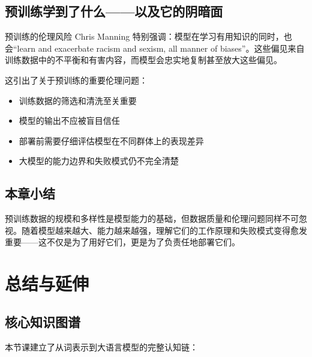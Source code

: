 \documentclass[a4paper]{article}
\begin{document}
\subsection{预训练学到了什么——以及它的阴暗面}





\begin{warningbox}{预训练的伦理风险}
Chris Manning 特别强调：模型在学习有用知识的同时，也会``learn and exacerbate racism and sexism, all manner of biases''。这些偏见来自训练数据中的不平衡和有害内容，而模型会忠实地复制甚至放大这些偏见。

这引出了关于预训练的重要伦理问题：
\begin{itemize}
    \item 训练数据的筛选和清洗至关重要
    \item 模型的输出不应被盲目信任
    \item 部署前需要仔细评估模型在不同群体上的表现差异
    \item 大模型的能力边界和失败模式仍不完全清楚
\end{itemize}
\end{warningbox}

\subsection{本章小结}

预训练数据的规模和多样性是模型能力的基础，但数据质量和伦理问题同样不可忽视。随着模型越来越大、能力越来越强，理解它们的工作原理和失败模式变得愈发重要——这不仅是为了用好它们，更是为了负责任地部署它们。


\section{总结与延伸}

\subsection{核心知识图谱}

本节课建立了从词表示到大语言模型的完整认知链：
\end{document}
